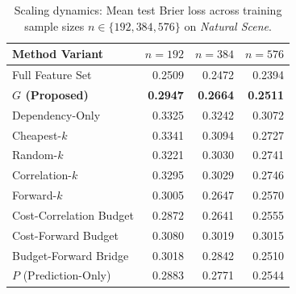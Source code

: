 \begin{table}[htbp]
	\centering\small\renewcommand{\arraystretch}{1.25}\setlength{\tabcolsep}{8pt}
	\caption{Scaling dynamics: Mean test Brier loss across training sample sizes $n \in \{192, 384, 576\}$ on \textit{Natural Scene}.}
	\label{tab:baselines-scaling}
	\begin{tabular}{l rrr}\hline
		Method Variant & $n=192$ & $n=384$ & $n=576$\\\hline
		Full Feature Set & 0.2509 & 0.2472 & 0.2394\\
		\textbf{$G$ (Proposed)} & \textbf{0.2947} & \textbf{0.2664} & \textbf{0.2511}\\
		Dependency-Only & 0.3325 & 0.3242 & 0.3072\\
		Cheapest-$k$ & 0.3341 & 0.3094 & 0.2727\\
		Random-$k$ & 0.3221 & 0.3030 & 0.2741\\
		Correlation-$k$ & 0.3295 & 0.3029 & 0.2746\\
		Forward-$k$ & 0.3005 & 0.2647 & 0.2570\\
		Cost-Correlation Budget & 0.2872 & 0.2641 & 0.2555\\
		Cost-Forward Budget & 0.3080 & 0.3019 & 0.3015\\
		Budget-Forward Bridge & 0.3018 & 0.2842 & 0.2510\\
		$P$ (Prediction-Only) & 0.2883 & 0.2771 & 0.2544\\
		\hline\end{tabular}
\end{table}

